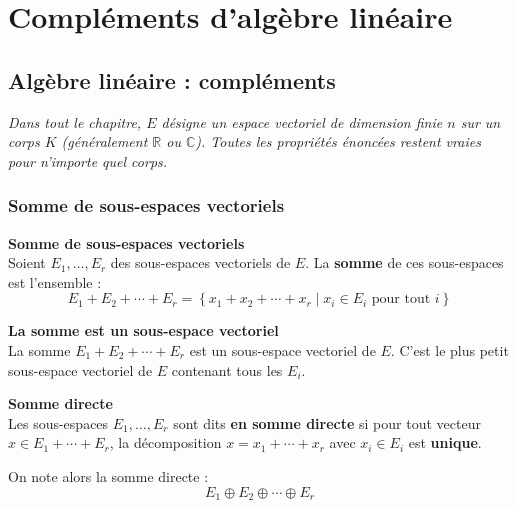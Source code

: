 \documentclass[../PolyS4.tex]{subfiles}
\begin{document}
\setcounter{chapter}{6}
\chapter{Compléments d'algèbre linéaire}
\section{Algèbre linéaire : compléments}

\textit{Dans tout le chapitre, $E$ désigne un espace vectoriel de dimension finie $n$ sur un corps $K$ (généralement $\mathbb{R}$ ou $\mathbb{C}$). Toutes les propriétés énoncées restent vraies pour n'importe quel corps.}

\subsection{Somme de sous-espaces vectoriels}

\begin{Def}\textbf{Somme de sous-espaces vectoriels}\\

Soient $E_1, \ldots, E_r$ des sous-espaces vectoriels de $E$. La \textbf{somme} de ces sous-espaces est l'ensemble :
$$E_1 + E_2 + \cdots + E_r = \left\{ x_1 + x_2 + \cdots + x_r \mid x_i \in E_i \text{ pour tout } i \right\}$$
\end{Def}

\begin{Prop}\textbf{La somme est un sous-espace vectoriel}\\

La somme $E_1 + E_2 + \cdots + E_r$ est un sous-espace vectoriel de $E$. C'est le plus petit sous-espace vectoriel de $E$ contenant tous les $E_i$.
\end{Prop}

\begin{Def}\textbf{Somme directe}\\

Les sous-espaces $E_1, \ldots, E_r$ sont dits \textbf{en somme directe} si pour tout vecteur $x \in E_1 + \cdots + E_r$, la décomposition $x = x_1 + \cdots + x_r$ avec $x_i \in E_i$ est \textbf{unique}.

On note alors la somme directe :
$$E_1 \oplus E_2 \oplus \cdots \oplus E_r$$
\end{Def}
\end{document}
